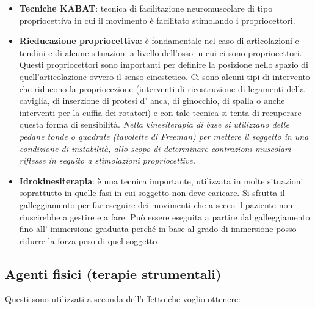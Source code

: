 \begin{itemize}
\item
  \textbf{Tecniche KABAT}: tecnica di facilitazione neuromuscolare di tipo propriocettiva in cui il movimento è facilitato stimolando i propriocettori.
\item
  \textbf{Rieducazione propriocettiva}: è fondamentale nel caso di articolazioni e tendini e di alcune situazioni a livello dell'osso in cui ci sono propriocettori. Questi propriocettori sono importanti per definire la posizione nello spazio di quell'articolazione ovvero il senso cinestetico. Ci sono alcuni tipi di intervento che riducono la propriocezione (interventi di ricostruzione di legamenti della caviglia, di inserzione di protesi d' anca, di ginocchio, di spalla o anche interventi per la cuffia dei rotatori) e con tale tecnica si tenta di recuperare questa forma di sensibilità. \emph{Nella kinesiterapia di base si utilizzano delle pedane tonde o quadrate (tavolette di Freeman) per mettere il soggetto in una condizione di instabilità, allo scopo di determinare contrazioni muscolari riflesse in seguito a stimolazioni propriocettive.}
\item
  \textbf{Idrokinesiterapia}: è una tecnica importante, utilizzata in molte situazioni soprattutto in quelle fasi in cui soggetto non deve caricare. Si sfrutta il galleggiamento per far eseguire dei movimenti che a secco il paziente non riuscirebbe a gestire e a fare. Può essere eseguita a partire dal galleggiamento fino all' immersione graduata perché in base al grado di immersione posso ridurre la forza peso di quel soggetto
\end{itemize}

\subsection{Agenti fisici (terapie strumentali)}

Questi sono utilizzati a seconda dell'effetto che voglio ottenere:

